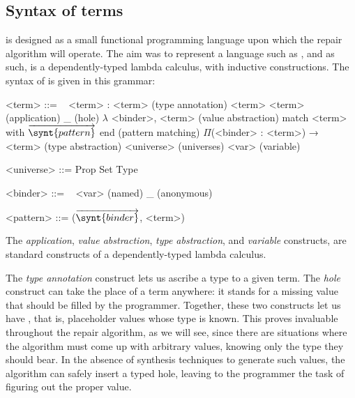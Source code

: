 \subsection{Syntax of \Chick{} terms}\label{chick-syntax-terms}

\Chick{} is designed as a small functional programming language upon which the
repair algorithm will operate.  The aim was to represent a language such as
\Gallina{}, and as such, \Chick{} is a dependently-typed lambda calculus, with
inductive constructions.  The syntax of \Chick{} is given in this grammar:

\begin{grammar}%
<term> ::= \ %
\alt <term> : <term>                                           \hfill (type annotation)
\alt <term> <term>                                             \hfill (application)
\alt _                                                         \hfill (hole)
\alt $\lambda$ <binder>, <term>                                \hfill (value abstraction)
\alt match <term> with $\overrightarrow{ \synt{pattern} }$ end \hfill (pattern matching)
\alt $\Pi$(<binder> : <term>) → <term>                         \hfill (type abstraction)
\alt <universe>                                                \hfill (universes)
\alt <var>                                                     \hfill (variable)

<universe> ::= Prop \alt Set \alt Type

<binder> ::= \ %
\alt <var> \hfill (named)
\alt _     \hfill (anonymous)

<pattern> ::= ($\overrightarrow{ \synt{binder} }$, <term>)
\end{grammar}

The \emph{application}, \emph{value abstraction}, \emph{type abstraction}, and
\emph{variable} constructs, are standard constructs of a dependently-typed
lambda calculus.

The \emph{type annotation} construct lets us ascribe a type to a given term.
The \emph{hole} construct can take the place of a term anywhere: it stands for a
missing value that should be filled by the programmer.  Together, these two
constructs let us have , that is, placeholder values whose
type is known.  This proves invaluable throughout the repair algorithm, as we
will see, since there are situations where the algorithm must come up with
arbitrary values, knowing only the type they should bear.  In the absence of
synthesis techniques to generate such values, the algorithm can safely insert a
typed hole, leaving to the programmer the task of figuring out the proper value.

